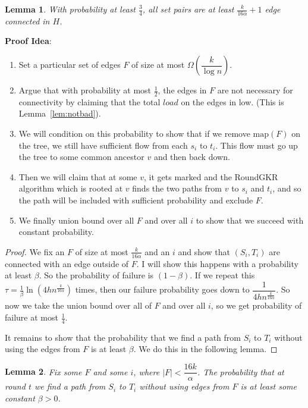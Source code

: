 \documentclass[12pt]{article}
\newtheorem{lemma}{Lemma}
\begin{document}
\begin{lemma}
With probability at least $\frac{3}{4}$, all set pairs are at least $\frac{k}{16\alpha} + 1$ edge connected in $H$. 
\end{lemma}

\textbf{Proof Idea}:
\begin{enumerate}
\item Set a particular set of edges $F$ of size at most $\Omega(\dfrac{k}{\log n})$. 
\item Argue that with probability at most $\frac{1}{2}$, the edges in $F$ are not necessary for connectivity by claiming that the total $load$ on the edges in low. (This is Lemma~\ref{lem:notbad}). 
\item We will condition on this probability to show that if we remove $\text{map}(F)$ on the tree, we still have sufficient flow from each $s_i$ to $t_i$. This flow must go up the tree to some common ancestor $v$ and then back down.
\item Then we will claim that at some $v$, it gets marked and the RoundGKR algorithm which is rooted at $v$ finds the two paths from $v$ to $s_i$ and $t_i$, and so the path will be included with sufficient probability and exclude $F$.
\item We finally union bound over all $F$ and over all $i$ to show that we succeed with constant probability. 
\end{enumerate}

\begin{proof}
We fix an $F$ of size at most $\frac{k}{16\alpha}$ and an $i$ and show that $(S_i, T_i)$ are connected with an edge outside of $F$. I will show this happens with a probability at least $\beta$. So the probability of failure is $(1-\beta)$. If we repeat this $\tau = \frac{1}{\beta}\ln(4hn^{\frac{k}{16\alpha}})$ times, then our failure probability goes down to $\dfrac{1}{4hn^{\frac{k}{16\alpha}}}$. So now we take the union bound over all of $F$ and over all $i$, so we get probability of failure at most $\frac{1}{4}$.

It remains to show that the probability that we find a path from $S_i$ to $T_i$ without using the edges from $F$ is at least $\beta$. We do this in the following lemma.
\end{proof}

\begin{lemma}
Fix some $F$ and some $i$, where $|F| < \dfrac{16k}{\alpha}$. The probability that at round $t$ we find a path from $S_i$ to $T_i$ without using edges from $F$ is at least some constant $\beta > 0$. 
\end{lemma}
\end{document}
